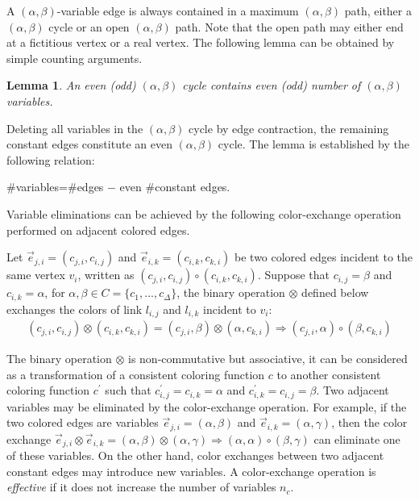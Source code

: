 \documentclass[11pt]{article}
\newtheorem{lemma}[theorem]{Lemma}
\newenvironment{proof}[1][Proof]{\begin{trivlist}
\item[\hskip \labelsep {\bfseries #1}]}{\end{trivlist}}
\newenvironment{definition}[1][Definition]{\begin{trivlist}
\item[\hskip \labelsep {\bfseries #1}]}{\end{trivlist}}
\newcommand{\qed}{\nobreak \ifvmode \relax \else
      \ifdim\lastskip<1.5em \hskip-\lastskip
      \hskip1.5em plus0em minus0.5em \fi \nobreak
      \vrule height0.75em width0.5em depth0.25em\fi}
\begin{document}
A $(\alpha,\beta)$-variable edge is always contained in a maximum $(\alpha,\beta)$ path, either a $(\alpha,\beta)$ cycle or an open $(\alpha,\beta)$ path. Note that the open path may either end at a fictitious vertex or a real vertex. The following lemma can be obtained by simple counting arguments.

\begin{lemma}
\label{lemma:oddeven}
An even (odd) $(\alpha,\beta)$ cycle contains even (odd) number of $(\alpha,\beta)$ variables. 
\end{lemma}
\begin{proof}
Deleting all variables  in the $(\alpha,\beta)$ cycle by edge contraction, the remaining constant edges constitute an even $(\alpha,\beta)$ cycle. The lemma is established by the following relation:
\begin{center}
 $\#$variables=$\#$edges $-$ even $\#$constant edges. \qed
\end{center}
\end{proof}

Variable eliminations can be achieved by the following color-exchange operation performed on adjacent colored edges.

\begin{definition}
\label{definition:colorexchange}
Let $\vec{e}_{j,i}  =(c_{j,i},c_{i,j} )$   and $\vec{e}_{i,k}=(c_{i,k},c_{k,i})$ be two colored edges incident to the same vertex $v_i$, written as $(c_{j,i},c_{i,j} )\circ (c_{i,k},c_{k,i} )$. Suppose that $c_{i,j}=\beta$ and $c_{i,k}=\alpha$, for $\alpha,\beta \in C=\{c_1,...,c_\Delta \}$, the binary operation $\otimes$ defined below exchanges the colors of link $l_{i,j}$ and $l_{i,k}$ incident to $v_i$:
\begin{align}
  (c_{j,i},c_{i,j} ) \otimes (c_{i,k},c_{k,i}) = (c_{j,i},\beta ) \otimes (\alpha,c_{k,i}) \Rightarrow (c_{j,i},\alpha) \circ (\beta ,c_{k,i}) \nonumber
\end{align}
\end{definition}

The binary operation $\otimes$ is non-commutative but associative, it can be considered as a transformation of a consistent coloring function $c$ to another consistent coloring function $c^{'}$ such that $c_{i,j}^{'}=c_{i,k}=\alpha$ and $c_{i,k}^{'}=c_{i,j}=\beta$. Two adjacent variables may be eliminated by the color-exchange operation. For example, if the two colored edges are variables $\vec{e}_{j,i}=(\alpha,\beta)$ and $\vec{e}_{i,k}=(\alpha,\gamma)$, then the color exchange $\vec{e}_{j,i} \otimes  \vec{e}_{i,k} = (\alpha,\beta) \otimes (\alpha,\gamma) \Rightarrow (\alpha,\alpha) \circ (\beta,\gamma) $ can eliminate one of these variables. On the other hand, color exchanges between two adjacent constant edges may introduce new variables. A color-exchange operation is {\it effective} if it does not increase the number of variables $n_c$.
\end{document}

